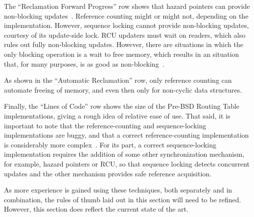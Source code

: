 The ``Reclamation Forward Progress'' row shows that hazard pointers
can provide non-blocking updates~\cite{MagedMichael04a,HerlihyLM02}.
Reference counting might or might not, depending on the implementation.
However, sequence locking cannot provide non-blocking updates, courtesy
of its update-side lock.
RCU updaters must wait on readers, which also rules out fully non-blocking
updates.
However, there are situations in which the only blocking operation is
a wait to free memory, which results in an situation that, for many
purposes, is as good as non-blocking~\cite{MathieuDesnoyers2012URCU}.

As shown in the ``Automatic Reclamation'' row, only reference
counting can automate freeing of memory, and even then only
for non-cyclic data structures.

Finally, the ``Lines of Code'' row shows the size of the Pre-BSD
Routing Table implementations, giving a rough idea of relative ease of use.
That said, it is important to note that the reference-counting and
sequence-locking implementations are buggy, and that a correct
reference-counting implementation is considerably
more complex~\cite{Valois95a,MagedMichael95a}.
For its part, a correct sequence-locking implementation requires
the addition of some other synchronization mechanism, for example,
hazard pointers or RCU, so that sequence locking detects concurrent
updates and the other mechanism provides safe reference acquisition.

As more experience is gained using these techniques, both separately
and in combination, the rules of thumb laid out in this section will
need to be refined.
However, this section does reflect the current state of the art.
